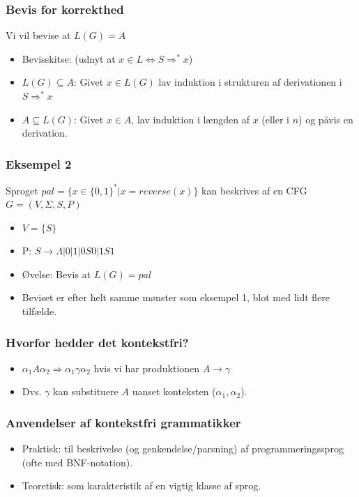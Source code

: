 \documentclass[handout]{beamer}
\begin{document}
\begin{frame}
\frametitle{Bevis for korrekthed}
Vi vil bevise at $L(G)=A$
\begin{itemize}[<+->]
\item Bevisskitse: (udnyt at $x\in L \Leftrightarrow S \Rightarrow^* x$)
\item $L(G) \subseteq A$: Givet $x\in L(G)$ lav induktion i strukturen af derivationen i $S \Rightarrow^* x$
\item $A \subseteq L(G)$: Givet $x\in A$, lav induktion i længden af $x$ (eller i $n$) og påvis en derivation.
\end{itemize}
\end{frame}

\begin{frame}
\frametitle{Eksempel 2}
Sproget $pal=\{x\in \{0,1\}^* | x = reverse(x)\}$ kan beskrives af en CFG $G = (V, \Sigma, S, P)$
\begin{itemize}[<+->]
\item $V=\{S\}$
\item P: $S\rightarrow \Lambda | 0 | 1 | 0S0 | 1S1$
\item Øvelse: Bevis at $L(G) = pal$
\item Beviset er efter helt samme mønster som eksempel 1, blot med lidt flere tilfælde.
\end{itemize}
\end{frame}


\begin{frame}
\frametitle{Hvorfor hedder det kontekstfri?}
\begin{itemize}[<+->]
\item $\alpha_1A\alpha_2 \Rightarrow \alpha_1\gamma\alpha_2$ hvis vi har produktionen $A\rightarrow \gamma$
\item Dvs. $\gamma$ kan substituere $A$ uanset konteksten ($\alpha_1, \alpha_2$).
\end{itemize}
\end{frame}

\begin{frame}
\frametitle{Anvendelser af kontekstfri grammatikker}
\begin{itemize}[<+->]
\item Praktisk: til beskrivelse (og genkendelse/parsning) af
  programmeringssprog (ofte med BNF-notation).
\item Teoretisk: som karakteristik af en vigtig klasse af sprog.
\end{itemize}
\end{frame}
\end{document}

